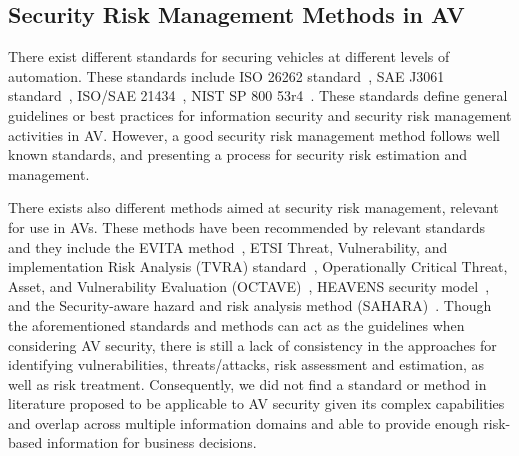 \documentclass[runningheads]{llncs}
\begin{document}
\subsection{Security Risk Management Methods in AV}
There exist different standards for securing vehicles at different levels of automation. These standards include ISO 26262 standard~\cite{palin2011iso}, SAE J3061 standard~\cite{vehicle2016j3061}, ISO/SAE 21434~\cite{SAECybersecurity}, NIST SP 800 53r4~\cite{joint2013nist}. 
These standards define general guidelines or best practices for information security and security risk management activities in AV. However, a good security risk management method follows well known standards, and presenting a process for security risk estimation and management.

There exists also different methods aimed at security risk management, relevant for use in AVs. These methods have been recommended by relevant standards~\cite{vehicle2016j3061} and they include the EVITA method~\cite{evita2011safety}, ETSI Threat, Vulnerability, and implementation Risk Analysis (TVRA) standard~\cite{etsi2011182}, Operationally Critical Threat, Asset, and Vulnerability Evaluation (OCTAVE)~\cite{CaralliEtAl2007}, HEAVENS security model~\cite{olovsson2018healing}, and the Security-aware hazard and risk analysis method (SAHARA)~\cite{macher2015sahara}. 
Though the aforementioned standards and methods can act as the guidelines when considering AV security, there is still a lack of consistency in the approaches for identifying vulnerabilities, threats/attacks, risk assessment and estimation, as well as risk treatment. Consequently, we did not find a standard or method in literature proposed to be applicable to AV security %
given its complex capabilities and overlap across multiple information domains and able to provide enough risk-based information for business decisions.
\end{document}
